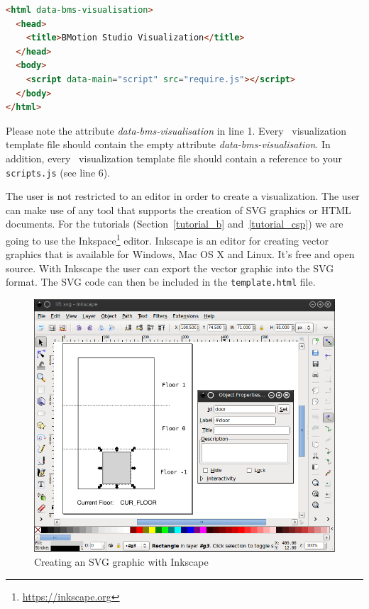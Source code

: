 \begin{lstlisting}[language=html]
<html data-bms-visualisation>
  <head>
    <title>BMotion Studio Visualization</title>
  </head>
  <body>
    <script data-main="script" src="require.js"></script>
  </body>
</html>
\end{lstlisting}

Please note the attribute \textit{data-bms-visualisation} in line 1.
Every \bms\ visualization template file should contain the empty attribute \textit{data-bms-visualisation}.
In addition, every \bms\ visualization template file should contain a reference to your \texttt{scripts.js} (see line 6).


The user is not restricted to an editor in order to create a visualization.
The user can make use of any tool that supports the creation of SVG graphics or HTML documents.
For the tutorials (Section~\ref{tutorial_b} and~\ref{tutorial_csp}) we are going to use the Inkspace\footnote{\url{https://inkscape.org}} editor. Inkscape is an editor for creating vector graphics that is available for Windows, Mac OS X and Linux.
It's free and open source.
With Inkscape the user can export the vector graphic into the SVG format.
The SVG code can then be included in the \texttt{template.html} file.

\begin{figure}[!ht]
\begin{center}
	\includegraphics[width=12cm]{img/tutorial/tut_02.png}
	\caption{Creating an SVG graphic with Inkscape}
	\label{fig_tut_02_inkscape}
\end{center}
\end{figure} 

